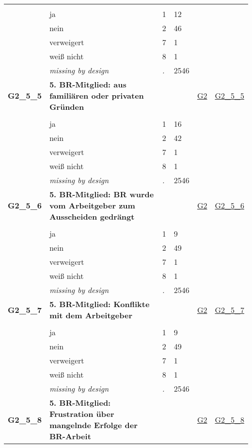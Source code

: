 \begin{longtable}{| L{2.45cm} | L{6cm} | C{1.5cm} | R{1cm} | C{2.25cm} | C{2.25cm} |}
   &  &  &  &  &  \\ 
   & ja & 1 & 12 &  &  \\ 
   & nein & 2 & 46 &  &  \\ 
   & verweigert & 7 & 1 &  &  \\ 
   & weiß nicht & 8 & 1 &  &  \\ 
   & \textit{missing by design} & \textit{.} & 2546 &  &  \\ 
   \midrule
\textbf{G2\_5\_5}\label{var:G2:5:5} & \textbf{5. BR-Mitglied: aus familiären oder privaten Gründen} &  &  & \hyperref[G2]{G2} & \hyperref[var:suf:G2:5:5]{G2\_5\_5} \\ 
   &  &  &  &  &  \\ 
   & ja & 1 & 16 &  &  \\ 
   & nein & 2 & 42 &  &  \\ 
   & verweigert & 7 & 1 &  &  \\ 
   & weiß nicht & 8 & 1 &  &  \\ 
   & \textit{missing by design} & \textit{.} & 2546 &  &  \\ 
   \midrule
\textbf{G2\_5\_6}\label{var:G2:5:6} & \textbf{5. BR-Mitglied: BR wurde vom Arbeitgeber zum Ausscheiden gedrängt} &  &  & \hyperref[G2]{G2} & \hyperref[var:suf:G2:5:6]{G2\_5\_6} \\ 
   &  &  &  &  &  \\ 
   & ja & 1 & 9 &  &  \\ 
   & nein & 2 & 49 &  &  \\ 
   & verweigert & 7 & 1 &  &  \\ 
   & weiß nicht & 8 & 1 &  &  \\ 
   & \textit{missing by design} & \textit{.} & 2546 &  &  \\ 
   \midrule
\textbf{G2\_5\_7}\label{var:G2:5:7} & \textbf{5. BR-Mitglied: Konflikte mit dem Arbeitgeber} &  &  & \hyperref[G2]{G2} & \hyperref[var:suf:G2:5:7]{G2\_5\_7} \\ 
   &  &  &  &  &  \\ 
   & ja & 1 & 9 &  &  \\ 
   & nein & 2 & 49 &  &  \\ 
   & verweigert & 7 & 1 &  &  \\ 
   & weiß nicht & 8 & 1 &  &  \\ 
   & \textit{missing by design} & \textit{.} & 2546 &  &  \\ 
   \midrule
\textbf{G2\_5\_8}\label{var:G2:5:8} & \textbf{5. BR-Mitglied: Frustration über mangelnde Erfolge der BR-Arbeit} &  &  & \hyperref[G2]{G2} & \hyperref[var:suf:G2:5:8]{G2\_5\_8} \\ 

\end{longtable}
